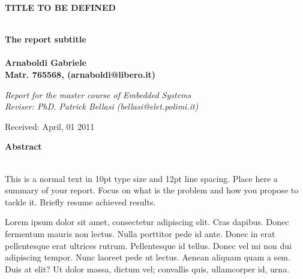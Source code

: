 \documentclass[a4paper,10pt]{article}
\newenvironment*{mytitle}{\begin{LARGE}\bf}{\end{LARGE}\\}%
\newenvironment*{mysubtitle}{\bf}{\\[1.5ex]}%
\newenvironment*{myabstract}{\begin{Large}\bf}{\end{Large}\\[2.5ex]}%
\begin{document}
\nocite{*}
\begin{mytitle}TITLE TO BE DEFINED\end{mytitle}
\begin{mysubtitle}The report subtitle\end{mysubtitle}
%
%
\\
Arnaboldi Gabriele\\
Matr. 765568, (arnaboldi@libero.it)\\
\hspace{10ex}
\begin{flushright}
\emph{Report for the master course of Embedded Systems}\\
\emph{Reviser: PhD. Patrick Bellasi (bellasi@elet.polimi.it)}
\end{flushright}

Received: April, 01 2011\\
\hspace{10ex}

\begin{myabstract} Abstract \end{myabstract}
This is a normal text in 10pt type size and 12pt line spacing.
Place here a summary of your report. Focus on what is the problem and how you
propose to tackle it. Briefly resume achieved results.

Lorem ipsum dolor sit amet, consectetur adipiscing elit. Cras dapibus. Donec
fermentum mauris non lectus. Nulla porttitor pede id ante. Donec in erat
pellentesque erat ultrices rutrum. Pellentesque id tellus. Donec vel mi non dui
adipiscing tempor.  Nunc laoreet pede ut lectus. Aenean aliquam quam a sem. Duis
at elit? Ut dolor massa, dictum vel; convallis quis, ullamcorper id, urna.

\vspace{4ex}	%
\begin{multicols}{2}










\end{multicols}
\end{document}
